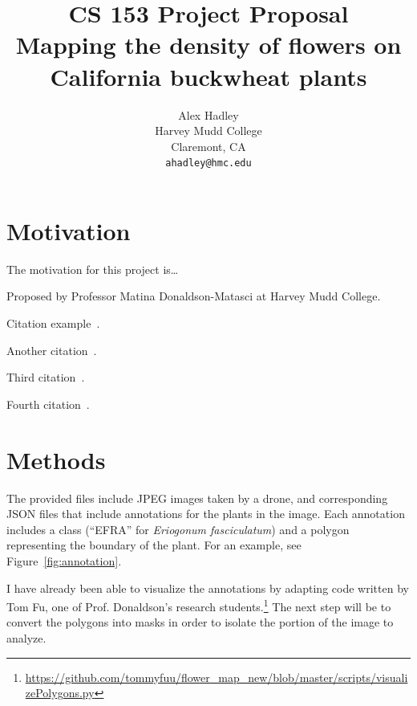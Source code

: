 \documentclass[10pt,twocolumn,letterpaper]{article}
\begin{document}
\title{CS 153 Project Proposal\\
Mapping the density of flowers on California buckwheat plants
}

\author{Alex Hadley\\
Harvey Mudd College\\
Claremont, CA\\
{\tt\small ahadley@hmc.edu}
}
\maketitle


\section{Motivation}

The motivation for this project is\dots

Proposed by Professor Matina Donaldson-Matasci at Harvey Mudd College.

Citation example~\cite{Potts}.

Another citation~\cite{Donaldson}.

Third citation~\cite{Donkersley}.

Fourth citation~\cite{Rzanny}.

\section{Methods}

The provided files include JPEG images taken by a drone, and corresponding JSON files that include annotations for the plants in the image. Each annotation includes a class (``EFRA'' for \textit{Eriogonum fasciculatum}) and a polygon representing the boundary of the plant. For an example, see Figure~\ref{fig:annotation}.

I have already been able to visualize the annotations by adapting code written by Tom Fu, one of Prof. Donaldson's research students.\footnote{\url{https://github.com/tommyfuu/flower_map_new/blob/master/scripts/visualizePolygons.py}} The next step will be to convert the polygons into masks in order to isolate the portion of the image to analyze.
\end{document}
